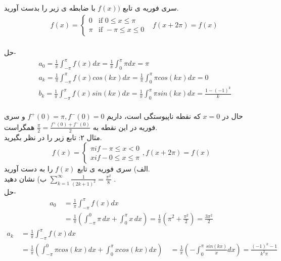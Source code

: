 \begin{example}
سری فوریه ی تابع
$f(x))$
با ضابطه ی زیر را بدست آورید.
\begin{align*}
&f(x)=
\begin{cases}
0 &\mbox{if } 0\le x\le \pi
\\
\pi &\mbox{if } -\pi\le x \le 0
\end{cases}
& f(x+2\pi)=f(x)
\end{align*}
\hrulefill
\\
حل-
\begin{equation*}
\begin{aligned}
{} &\ a_0=\frac{1}{\pi}\int_{-\pi}^{\pi}{f(x)dx}=\frac{1}{\pi}\int_{0}^{\pi}{\pi dx}=\pi\\
&\ a_k=\frac{1}{\pi}\int_{-\pi}^{\pi}{f(x)cos(kx)dx}=\frac{1}{\pi}\int_{0}^{\pi}{\pi cos(kx) dx}=0\\
&\ b_k=\frac{1}{\pi}\int_{-\pi}^{\pi}{f(x)sin(kx)dx}=\frac{1}{\pi}\int_{0}^{\pi}{\pi sin(kx) dx}=\frac{1-(-1)^k}{k}\\
\end{aligned}
\end{equation*}

\end{example}
\hrulefill
حال در 
$x=0$
که نقطه ناپیوستگی است، داریم
$f^+(0)=\pi , f^-(0)=0$
و  سری فوریه در این نقطه به
$\frac{\pi}{2}=\frac{f^+(0)+f^-(0)}{2}$
همگراست.\\
مثال ۲: تابع زیر را در نظر بگیرید.
\[
f(x)=
\begin{cases}
	\pi if -\pi\le x< 0
	\\
	x if -0\le x \le \pi
\end{cases}
, f(x+2\pi)=f(x)
\]
الف) سری فوریه ی تابع 
$f(x)$
را به دست آورید.\\
ب) نشان دهید 
$\sum_{k=1}^{\infty}{\frac{1}{(2k+1)^2}}=\frac{\pi^2}{8}$
.\\
حل-
\begin{equation*}
	\begin{aligned}
		a_0 {}
		&\
		=\frac{1}{\pi}\int_{-\pi}^{\pi}{f(x)dx}\\
		&\
		=\frac{1}{\pi}\left(\int_{-\pi}^{0}{\pi \, dx}+\int_{0}^{\pi}{x \, dx}\right)=\frac{1}{\pi}\left(\pi^2+\frac{\pi^2}{2}\right)=\frac{3\pi^2}{2}
	\end{aligned}
\end{equation*}
\begin{equation*}
	\begin{aligned}
		a_k {} &\
		=\frac{1}{\pi}\int_{-\pi}^{\pi}{f(x)dx} \\
		&\
		=\frac{1}{\pi}\left(\int_{-\pi}^{0}{\pi cos(kx)dx}+\int_{0}^{\pi}{x cos(kx)dx}\right)
		&\
		=\frac{1}{\pi}\left(-\int_0^\pi{\frac{sin(kx)}{x}dx}\right)=\frac{(-1)^k-1}{k^2\pi}
	\end{aligned}
\end{equation*}

